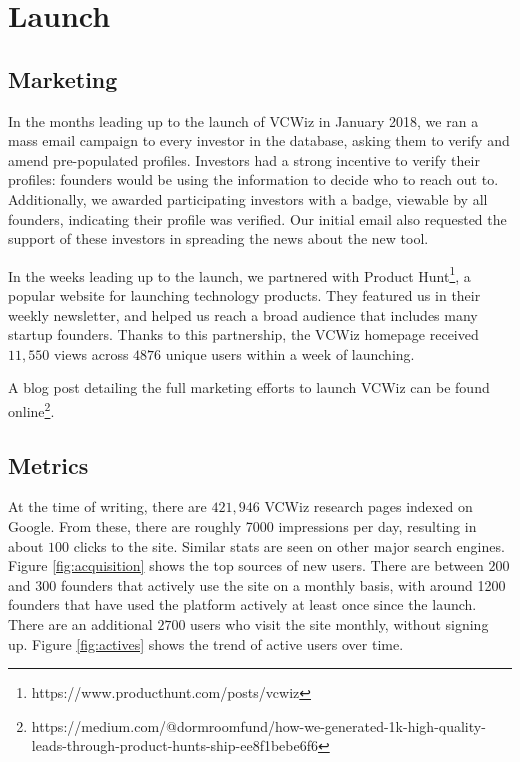 \section{Launch}

\subsection{Marketing}

In the months leading up to the launch of VCWiz in January 2018, we ran a mass email campaign to every investor in the database, asking them to verify and amend pre-populated profiles. Investors had a strong incentive to verify their profiles: founders would be using the information to decide who to reach out to. Additionally, we awarded participating investors with a badge, viewable by all founders, indicating their profile was verified. Our initial email also requested the support of these investors in spreading the news about the new tool.

In the weeks leading up to the launch, we partnered with Product Hunt\footnote{https://www.producthunt.com/posts/vcwiz}, a popular website for launching technology products. They featured us in their weekly newsletter, and helped us reach a broad audience that includes many startup founders. Thanks to this partnership, the VCWiz homepage received $11,550$ views across $4876$ unique users within a week of launching.

A blog post detailing the full marketing efforts to launch VCWiz can be found online\footnote{https://medium.com/@dormroomfund/how-we-generated-1k-high-quality-leads-through-product-hunts-ship-ee8f1bebe6f6}.

\subsection{Metrics}

At the time of writing, there are $421,946$ VCWiz research pages indexed on Google. From these, there are roughly 7000 impressions per day, resulting in about $100$ clicks to the site. Similar stats are seen on other major search engines. Figure \ref{fig:acquisition} shows the top sources of new users. There are between $200$ and $300$ founders that actively use the site on a monthly basis, with around 1200 founders that have used the platform actively at least once since the launch. There are an additional $2700$ users who visit the site monthly, without signing up. Figure \ref{fig:actives} shows the trend of active users over time.

